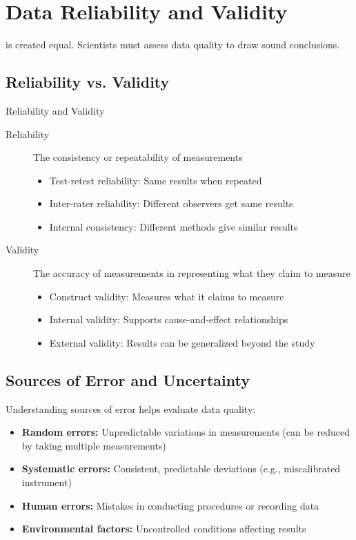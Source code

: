 \section{Data Reliability and Validity}

 is created equal. Scientists must assess data quality to draw sound conclusions.

\subsection{Reliability vs. Validity}

\begin{keyconcept}{Reliability and Validity}
\begin{description}
    \item[Reliability] The consistency or repeatability of measurements
    \begin{itemize}
        \item Test-retest reliability: Same results when repeated
        \item Inter-rater reliability: Different observers get same results
        \item Internal consistency: Different methods give similar results
    \end{itemize}
    
    \item[Validity] The accuracy of measurements in representing what they claim to measure
    \begin{itemize}
        \item Construct validity: Measures what it claims to measure
        \item Internal validity: Supports cause-and-effect relationships
        \item External validity: Results can be generalized beyond the study
    \end{itemize}
\end{description}
\end{keyconcept}

\subsection{Sources of Error and Uncertainty}

Understanding sources of error helps evaluate data quality:

\begin{itemize}
    \item \textbf{Random errors:} Unpredictable variations in measurements (can be reduced by taking multiple measurements)
    
    \item \textbf{Systematic errors:} Consistent, predictable deviations (e.g., miscalibrated instrument)
    
    \item \textbf{Human errors:} Mistakes in conducting procedures or recording data
    
    \item \textbf{Environmental factors:} Uncontrolled conditions affecting results
\end{itemize}

